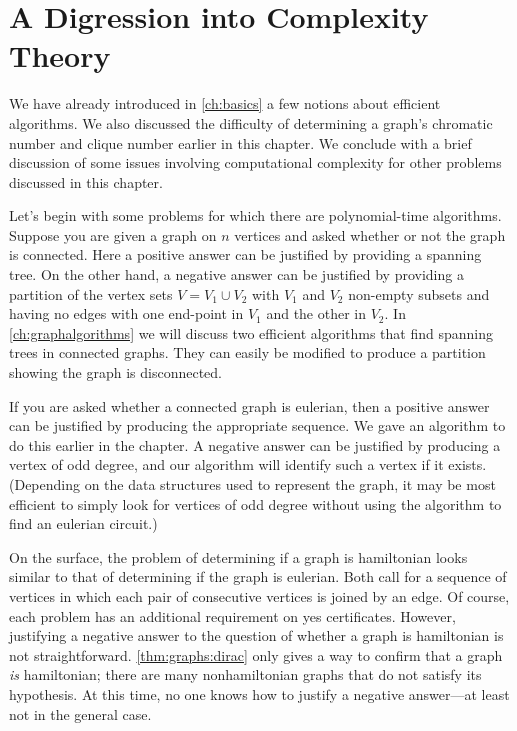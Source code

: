 

\section{A Digression into Complexity Theory}\label{s:graphs:complexity}

We have already introduced in \autoref{ch:basics} a few notions about
efficient algorithms. We also discussed the difficulty of determining
a graph's chromatic number and clique number earlier in this
chapter. We conclude with a brief discussion of some issues involving
computational complexity for other problems discussed in this chapter.

Let's begin with some problems for which there are polynomial-time
algorithms. Suppose you are given a graph on $n$ vertices and asked
whether or not the graph is connected. Here a positive answer can be
justified by providing a spanning tree.  On the other hand, a negative
answer can be justified by providing a partition of the vertex sets
$V=V_1\cup V_2$ with $V_1$ and $V_2$ non-empty subsets and having no
edges with one end-point in $V_1$ and the other in $V_2$. In
\autoref{ch:graphalgorithms} we will discuss two efficient algorithms
that find spanning trees in connected graphs. They can easily be
modified to produce a partition showing the graph is disconnected.

If you are asked whether a connected graph is eulerian, then a
positive answer can be justified by producing the appropriate
sequence. We gave an algorithm to do this earlier in the chapter. A
negative answer can be justified by producing a vertex of odd degree,
and our algorithm will identify such a vertex if it exists. (Depending
on the data structures used to represent the graph, it may be most
efficient to simply look for vertices of odd degree without using the
algorithm to find an eulerian circuit.)

On the surface, the problem of determining if a graph is hamiltonian
looks similar to that of determining if the graph is eulerian. Both
call for a sequence of vertices in which each pair of consecutive
vertices is joined by an edge. Of course, each problem has an
additional requirement on yes certificates. However, justifying a
negative answer to the question of whether a graph is hamiltonian is
not straightforward. \autoref{thm:graphs:dirac} only gives a way to
confirm that a graph \emph{is} hamiltonian; there are many
nonhamiltonian graphs that do not satisfy its hypothesis. At this
time, no one knows how to justify a negative answer---at least not in
the general case.

